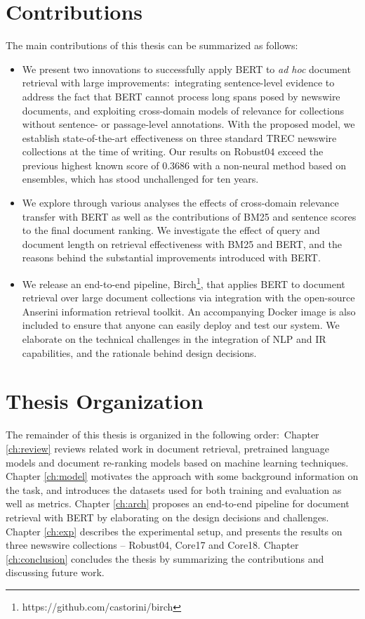 \vfill

\section{Contributions}

The main contributions of this thesis can be summarized as follows:\\

\begin{itemize}
\item
We present two innovations to successfully apply BERT to \textit{ad hoc} document retrieval with large improvements:\
integrating sentence-level evidence to address the fact that BERT cannot process long spans posed by newswire documents, and exploiting cross-domain models of relevance for collections without sentence- or passage-level annotations.
With the proposed model, we establish state-of-the-art effectiveness on three standard TREC newswire collections at the time of writing.
Our results on Robust04 exceed the previous highest known score of 0.3686 \cite{Cormack:2009:RRF:1571941.1572114} with a non-neural method based on ensembles, which has stood unchallenged for ten years.
\item
We explore through various analyses the effects of cross-domain relevance transfer with BERT as well as the contributions of BM25 and sentence scores to the final document ranking.
We investigate the effect of query and document length on retrieval effectiveness with BM25 and BERT, and the reasons behind the substantial improvements introduced with BERT.
\myworries{Revisit after completing experimental results}
\item
We release an end-to-end pipeline, Birch\footnote{https://github.com/castorini/birch}, that applies BERT to document retrieval over large document collections via integration with the open-source Anserini information retrieval toolkit.
An accompanying Docker image is also included to ensure that anyone can easily deploy and test our system.
We elaborate on the technical challenges in the integration of NLP and IR capabilities, and the rationale behind design decisions.
\end{itemize}

\section{Thesis Organization}

The remainder of this thesis is organized in the following order:\
Chapter \ref{ch:review} reviews related work in document retrieval, pretrained language models and document re-ranking models based on machine learning techniques.
Chapter \ref{ch:model} motivates the approach with some background information on the task, and introduces the datasets used for both training and evaluation as well as metrics.
Chapter \ref{ch:arch} proposes an end-to-end pipeline for document retrieval with BERT by elaborating on the design decisions and challenges.
Chapter \ref{ch:exp} describes the experimental setup, and presents the results on three newswire collections -- Robust04, Core17 and Core18.
Chapter \ref{ch:conclusion} concludes the thesis by summarizing the contributions and discussing future work.